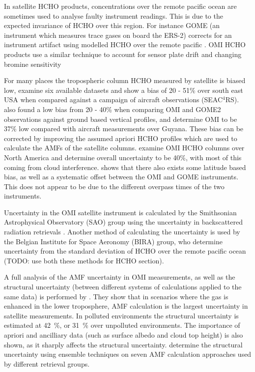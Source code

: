       In satellite HCHO products, concentrations over the remote pacific ocean are sometimes used to analyse faulty instrument readings.
      This is due to the expected invariance of HCHO over this region.
      For instance GOME (an instrument which measures trace gases on board the ERS-2) corrects for an instrument artifact using modelled HCHO over the remote pacific \citep{Shim2015}.
      OMI HCHO products use a similar technique to account for sensor plate drift and changing bromine sensitivity \citep{Abad2015}
      
      For many places the tropospheric column HCHO measured by satellite is biased low, \citet{Zhu2016} examine six available datasets and show a bias of 20 - 51\% over south east USA when compared against a campaign of aircraft observations (SEAC$^4$RS).
      \citet{DeSmedt2015} also found a low bias from 20 - 40\% when comparing OMI and GOME2 observations against ground based vertical profiles, and \citet{Barkley2013} determine OMI to be 37\% low compared with aircraft measurements over Guyana.
      These bias can be corrected by improving the assumed apriori HCHO profiles which are used to calculate the AMFs of the satellite columns.
      \cite{Millet2006} examine OMI HCHO columns over North America and determine overall uncertainty to be 40\%, with most of this coming from cloud interference.
      \cite{Millet2008} shows that there also exists some latitude based bias, as well as a systematic offset between the OMI and GOME instruments.
      This does not appear to be due to the different overpass times of the two instruments.
      
      Uncertainty in the OMI satellite instrument is calculated by the Smithsonian Astrophysical Observatory (SAO) group using the uncertainty in backscattered radiation retrievals \citep{Abad2015, Abad2016}.
      Another method of calculating the uncertainty is used by the Belgian Institute for Space Aeronomy (BIRA) group, who determine uncertainty from the standard deviation of HCHO over the remote pacific ocean (TODO: use both these methods for HCHO section)\citep{DeSmedt2012, DeSmedt2015}.
      
      A full analysis of the AMF uncertainty in OMI measurements, as well as the structural uncertainty (between different systems of calculations applied to the same data) is performed by \cite{Lorente2017}.
      They show that in scenarios where the gas is enhanced in the lower troposphere, AMF calculation is the largest uncertainty in satellite measurements.
      In polluted environments the structural uncertainty is estimated at 42~\%, or 31~\% over unpolluted environments.
      The importance of apriori and ancilliary data (such as surface albedo and cloud top height) is also shown, as it sharply affects the structural uncertainty.
      \cite{Lorente2017} determine the structural uncertainty using ensemble techniques on seven AMF calculation approaches used by different retrieval groups.
      
